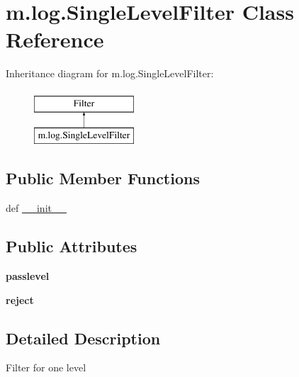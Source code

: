 \hypertarget{classm_1_1log_1_1_single_level_filter}{\section{m.\-log.\-Single\-Level\-Filter Class Reference}
\label{classm_1_1log_1_1_single_level_filter}
}
Inheritance diagram for m.\-log.\-Single\-Level\-Filter\-:\begin{figure}[H]
\begin{center}
\leavevmode
\includegraphics[height=2.000000cm]{classm_1_1log_1_1_single_level_filter}
\end{center}
\end{figure}
\subsection*{Public Member Functions}
\begin{DoxyCompactItemize}
\item 
def \hyperlink{classm_1_1log_1_1_single_level_filter_a0d9e04941fa9c8c37e6d49a2a38cc7e0}{\-\_\-\-\_\-init\-\_\-\-\_\-}
\end{DoxyCompactItemize}
\subsection*{Public Attributes}
\begin{DoxyCompactItemize}
\item 
\hypertarget{classm_1_1log_1_1_single_level_filter_ace7b691dfece2684f31ef1843cee6120}{{\bfseries passlevel}}\label{classm_1_1log_1_1_single_level_filter_ace7b691dfece2684f31ef1843cee6120}

\item 
\hypertarget{classm_1_1log_1_1_single_level_filter_a0d2c89b31ff79eff990febd51be3c127}{{\bfseries reject}}\label{classm_1_1log_1_1_single_level_filter_a0d2c89b31ff79eff990febd51be3c127}

\end{DoxyCompactItemize}


\subsection{Detailed Description}
\begin{DoxyVerb}Filter for one level\end{DoxyVerb}
 

